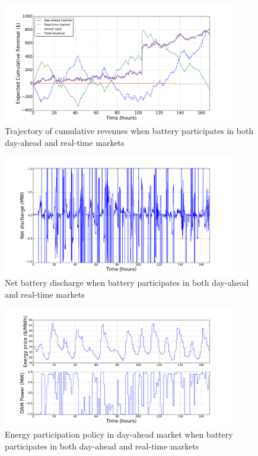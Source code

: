 \documentclass[11pt,twoside]{article}
\begin{document}
\begin{figure}[h!]
\begin{center}
\includegraphics[width=4in]{Figures/Plots/fullproblem_stoch/cumulative_rev_fp_st.pdf} \caption{Trajectory of cumulative revenues when battery participates in both day-ahead and real-time markets}\label{fig:cumulative_rev_fp_st}\end{center}
\end{figure}
\begin{figure}[h!]
\begin{center}
\includegraphics[width=4in]{Figures/Plots/fullproblem_stoch/netpower_fp_st.pdf} \caption{Net battery discharge when battery participates in both day-ahead and real-time markets}\label{fig:netpower_fp_st}\end{center}
\end{figure}
\begin{figure}[h!]
\begin{center}
\includegraphics[width=4in]{Figures/Plots/fullproblem_stoch/Pdam_fp_st.pdf} \caption{Energy participation policy in day-ahead market when battery participates in both day-ahead and real-time markets}\label{fig:Pdam_fp_st}\end{center}
\end{figure}
\end{document}
